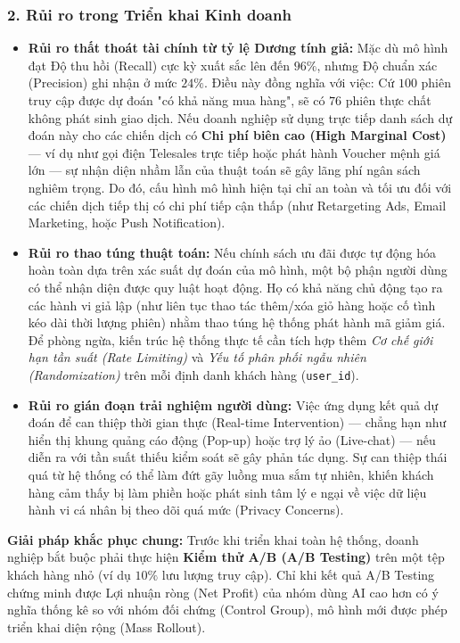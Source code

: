 \documentclass[a4paper,11pt]{article}
\begin{document}
\subsubsection*{2. Rủi ro trong Triển khai Kinh doanh}
\begin{itemize}[itemsep=4pt, leftmargin=*]
    \item \textbf{Rủi ro thất thoát tài chính từ tỷ lệ Dương tính giả:} Mặc dù mô hình đạt Độ thu hồi (Recall) cực kỳ xuất sắc lên đến $96\%$, nhưng Độ chuẩn xác (Precision) ghi nhận ở mức $24\%$. Điều này đồng nghĩa với việc: Cứ $100$ phiên truy cập được dự đoán "có khả năng mua hàng", sẽ có $76$ phiên thực chất không phát sinh giao dịch. Nếu doanh nghiệp sử dụng trực tiếp danh sách dự đoán này cho các chiến dịch có \textbf{Chi phí biên cao (High Marginal Cost)} — ví dụ như gọi điện Telesales trực tiếp hoặc phát hành Voucher mệnh giá lớn — sự nhận diện nhầm lẫn của thuật toán sẽ gây lãng phí ngân sách nghiêm trọng. Do đó, cấu hình mô hình hiện tại chỉ an toàn và tối ưu đối với các chiến dịch tiếp thị có chi phí tiếp cận thấp (như Retargeting Ads, Email Marketing, hoặc Push Notification).
    
    \item \textbf{Rủi ro thao túng thuật toán:} Nếu chính sách ưu đãi được tự động hóa hoàn toàn dựa trên xác suất dự đoán của mô hình, một bộ phận người dùng có thể nhận diện được quy luật hoạt động. Họ có khả năng chủ động tạo ra các hành vi giả lập (như liên tục thao tác thêm/xóa giỏ hàng hoặc cố tình kéo dài thời lượng phiên) nhằm thao túng hệ thống phát hành mã giảm giá. Để phòng ngừa, kiến trúc hệ thống thực tế cần tích hợp thêm \textit{Cơ chế giới hạn tần suất (Rate Limiting)} và \textit{Yếu tố phân phối ngẫu nhiên (Randomization)} trên mỗi định danh khách hàng (\texttt{user\_id}).
    
    \item \textbf{Rủi ro gián đoạn trải nghiệm người dùng:} Việc ứng dụng kết quả dự đoán để can thiệp thời gian thực (Real-time Intervention) — chẳng hạn như hiển thị khung quảng cáo động (Pop-up) hoặc trợ lý ảo (Live-chat) — nếu diễn ra với tần suất thiếu kiểm soát sẽ gây phản tác dụng. Sự can thiệp thái quá từ hệ thống có thể làm đứt gãy luồng mua sắm tự nhiên, khiến khách hàng cảm thấy bị làm phiền hoặc phát sinh tâm lý e ngại về việc dữ liệu hành vi cá nhân bị theo dõi quá mức (Privacy Concerns).
\end{itemize}
\textbf{Giải pháp khắc phục chung:} Trước khi triển khai toàn hệ thống, doanh nghiệp bắt buộc phải thực hiện \textbf{Kiểm thử A/B (A/B Testing)} trên một tệp khách hàng nhỏ (ví dụ $10\%$ lưu lượng truy cập). Chỉ khi kết quả A/B Testing chứng minh được Lợi nhuận ròng (Net Profit) của nhóm dùng AI cao hơn có ý nghĩa thống kê so với nhóm đối chứng (Control Group), mô hình mới được phép triển khai diện rộng (Mass Rollout).
\end{document}
